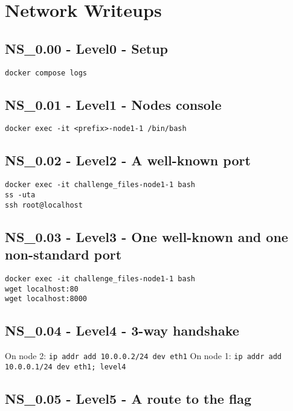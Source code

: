 \chapter{Network Writeups}
\section{NS_0.00 - Level0 - Setup}
\texttt{docker compose logs}

\section{NS_0.01 - Level1 - Nodes console}
\texttt{docker exec -it <prefix>-node1-1 /bin/bash}

\section{NS_0.02 - Level2 - A well-known port}
\begin{verbatim}
docker exec -it challenge_files-node1-1 bash
ss -uta
ssh root@localhost
\end{verbatim}

\section{NS_0.03 - Level3 - One well-known and one non-standard port}
\begin{verbatim}
docker exec -it challenge_files-node1-1 bash
wget localhost:80
wget localhost:8000
\end{verbatim}

\section{NS_0.04 - Level4 - 3-way handshake}
On node 2: \texttt{ip addr add 10.0.0.2/24 dev eth1}
On node 1: \texttt{ip addr add 10.0.0.1/24 dev eth1; level4}

\section{NS_0.05 - Level5 - A route to the flag}
